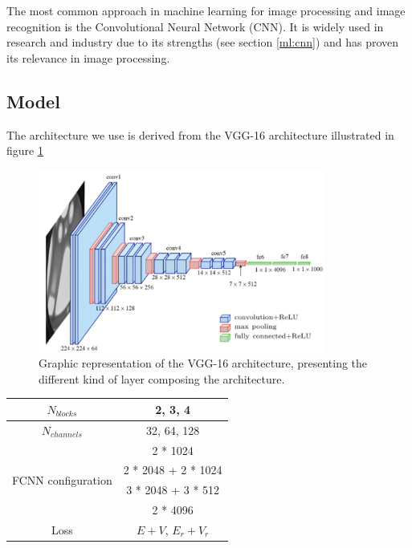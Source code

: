 The most common approach in machine learning for image processing and image recognition is the Convolutional Neural Network (CNN). It is widely used in research and industry \cite{simonyan_very_2015, ciresan_multi-column_2012, abbasi_convolutional_2021, maksimovic_cnns_2021} due to its strengths (see section \ref{ml:cnn}) and has proven its relevance in image processing.

\subsection{Model}

The architecture we use is derived from the VGG-16 architecture \cite{simonyan_very_2015} illustrated in figure \ref{fig:jcnn:vgg16}

\begin{figure}[ht]
  \centering
  \includegraphics[height=6cm]{images/jcnn/vgg16.png}
  \caption{Graphic representation of the VGG-16 architecture, presenting the different kind of layer composing the architecture.}
  \label{fig:jcnn:vgg16}
\end{figure}

\begin{table}[ht]
  \centering
  \begin{tabular}{ | c | c | }
    \hline $N_{blocks}$ & {2, 3, 4} \\
    \hline $N_{channels}$ & {32, 64, 128} \\
    \hline
    \multirow{4}{*}{FCNN configuration} & 2 * 1024 \\
                                        & 2 * 2048 + 2 * 1024 \\
                                        & 3 * 2048 + 3 * 512 \\
                                        & 2 * 4096 \\
    \hline
    Loss & $E+V$, $E_r + V_r$ \\
    \hline

  \end{tabular}
\end{table}

